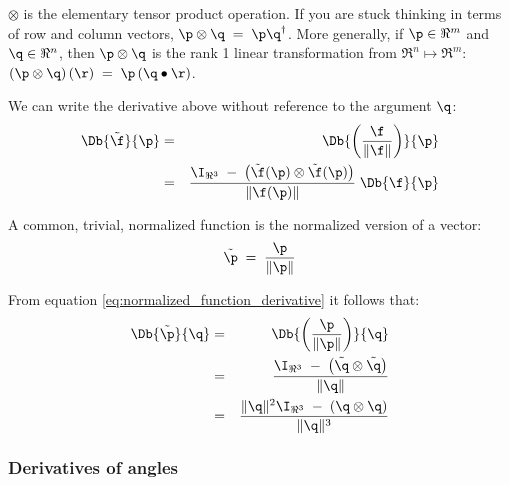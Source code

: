 $\otimes$ is the elementary tensor product operation.
If you are stuck thinking in terms of row and column vectors,
$\p \otimes \q \;= \;\p\q^\dagger$.
More generally, if $\p \in \Re^m$ and $\q \in \Re^n$,
then $\p \otimes \q$ is the rank 1 linear transformation from $\Re^n \mapsto \Re^m$:
$\left(\p \otimes \q\right) (\r) \;= \;\p \left(\q \bullet \r\right)$.

We can write the derivative above without reference to the argument $\q$:
\begin{eqnarray}
\label{eq:normalized_function_derivative}
\Db{\tilde{\f}}{\p}
& = &
\Db{\left({\f \over {\| \f \|}}\right)}{\p}  \\
& = &
{{\I_{\Re^3} \;- \;\left( \tilde{\f}(\p) \otimes \tilde{\f}(\p) \right) }
\over {\| \f(\p) \|} }
\;\Db{\f}{\p} \nonumber
\end{eqnarray}

A common, trivial, normalized function is the normalized version of
a vector:
\begin{equation}
\tilde{\p} \;= \;{{\p} \over {\| \p \|}}
\end{equation}

From equation \ref{eq:normalized_function_derivative}
it follows that:
\begin{eqnarray}
\label{eq:normalized_vector_derivative}
\Db{\tilde{\p}}{\q}
& = &
\Db{\left({\p \over {\| \p \|}}\right)}{\q}
\\
& = &
{{\I_{\Re^3} \;- \;\left( \tilde{\q} \otimes \tilde{\q} \right) }
\over {\| \q \|} }
\nonumber
\\
& = &
{{\| \q \|^2 \I_{\Re^3} \;- \;\left( \q \otimes \q \right) }
\over {\| \q \|^3} }
\nonumber
\end{eqnarray}


\subsubsection{Derivatives of angles}
\label{sec:angles}

